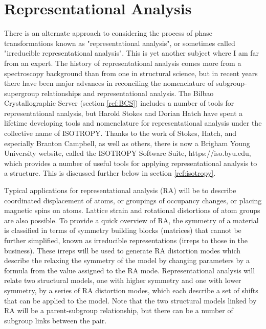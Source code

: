 \section{Representational Analysis}\label{ref:RA}
There is an alternate approach to considering the process of phase transformations known as "representational analysis", or sometimes called "irreducible representational analysis". This is yet another subject where I am far from an expert. The history of representational analysis comes more from a spectroscopy background than from one in structural science, but in recent years there have been major advances in reconciling the nomenclature of subgroup-supergroup relationships and representational analysis. The Bilbao Crystallographic Server (section \ref{ref:BCS}) includes a number of tools for representational analysis, but Harold Stokes and Dorian Hatch have spent a lifetime developing tools and nomenclature for representational analysis under the collective name of ISOTROPY. Thanks to the work of Stokes, Hatch, and especially Branton Campbell, as well as others, there is now a Brigham Young University website, called the ISOTROPY Software Suite, https://iso.byu.edu, which provides a number of useful tools for applying representational analysis to a structure. This is discussed further below in section \ref{ref:isotropy}.

Typical applications for representational analysis (RA) will be to describe coordinated displacement of atoms, or groupings of occupancy changes, or placing magnetic spins on atoms. Lattice strain and rotational distortions of atom groups are also possible. To provide a quick overview of RA, the symmetry of a material is classified in terms of symmetry building blocks (matrices) that cannot be further simplified, known as irreducible representations (irreps to those in the business). These irreps will be used to generate RA distortion modes which describe the relaxing the symmetry of the model by changing parameters by a formula from the value assigned to the RA mode. Representational analysis will relate two structural models, one with higher symmetry and one with lower symmetry, by a series of RA distortion modes, which each describe a set of shifts that can be applied to the model. Note that the two structural models linked by RA will be a parent-subgroup relationship, but there can be a number of subgroup links between the pair. 

